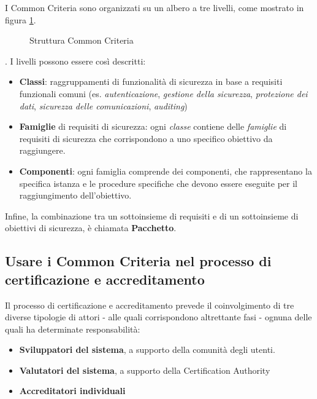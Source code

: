 \documentclass[../main.tex]{subfiles}
\begin{document}
I Common Criteria sono organizzati su un albero a tre livelli, come mostrato in figura \ref{fig:FigCCStruct}.
\begin{figure}[H]
   \centering
   \caption{Struttura Common Criteria \cite{SyntegraCC}}\label{fig:FigCCStruct}
\end{figure}.
I livelli possono essere così descritti:
\begin{itemize}
\item \textbf{Classi}: raggruppamenti di funzionalità di sicurezza in base a requisiti funzionali comuni (es. \textit{autenticazione}, \textit{gestione della sicurezza}, \textit{protezione dei dati}, \textit{ sicurezza delle comunicazioni}, \textit{auditing})
\item \textbf{Famiglie} di requisiti di sicurezza: ogni \textit{classe} contiene delle \textit{famiglie} di requisiti di sicurezza che corrispondono a uno specifico obiettivo da raggiungere.
\item \textbf{Componenti}: ogni famiglia comprende dei componenti, che rappresentano la specifica istanza e le procedure specifiche che devono essere eseguite per il raggiungimento dell'obiettivo.
\end{itemize}
Infine, la combinazione tra un sottoinsieme di requisiti e di un sottoinsieme di obiettivi di sicurezza, è chiamata \textbf{Pacchetto}.

\subsection{Usare i Common Criteria nel processo di certificazione e accreditamento}
Il processo di certificazione e accreditamento prevede il coinvolgimento di tre diverse tipologie di attori - alle quali corrispondono altrettante fasi - ognuna delle quali ha determinate responsabilità:
\begin{itemize}
\item \textbf{Sviluppatori del sistema}, a supporto della comunità degli utenti.\newline
\item \textbf{Valutatori del sistema}, a supporto della Certification Authority
\item \textbf{Accreditatori individuali}
\end{itemize}
\end{document}
